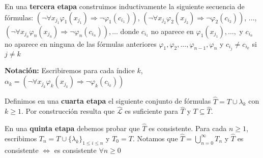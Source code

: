 En una \textbf{tercera etapa} construimos inductivamente la siguiente secuencia de f\'ormulas: $(\neg \forall x_{j_{1}} \varphi_{1}(x_{j_{1}}) \Rightarrow \neg \varphi_{1}(c_{i_{1}}))$, $(\neg \forall x_{j_{2}} \varphi_{2}(x_{j_{2}}) \Rightarrow \neg \varphi_{2}(c_{i_{2}}))$, $\ldots$, $(\neg \forall x_{j_{n}} \varphi_{n}(x_{j_{n}}) \Rightarrow \neg \varphi_{n}(c_{i_{n}})), \ldots$ donde $c_{i_{1}}$ no aparece en $\varphi_{1}(x_{j_{1}}), \ldots, $ y $c_{i_{n}}$ no aparece en ninguna de las f\'ormulas anteriores $\varphi_{1}, \varphi_{2}, \ldots, \varphi_{n - 1}, \varphi_{n}$ y $c_{i_{j}} \neq c_{i_{k}}$ si $j \neq k$
 
\textbf{Notaci\'on:} Escribiremos para cada \'indice $k$, $\alpha_{k} = (\neg \forall x_{j_{k}} \varphi_{k}(x_{j_{k}}) \Rightarrow \neg \varphi_{k}(c_{i_{k}}))$
 
Definimos en una \textbf{cuarta etapa} el siguiente conjunto de f\'ormulas $\hat{T} = T \cup {\lambda_k}$ con $k \geq 1$. Por construcci\'on resulta que $\hat{\mathcal{L}}$ es suficiente para $\hat{T}$ y $T \subseteq \hat{T}$. 
 
En una \textbf{quinta etapa} debemos probar que $\hat{T}$ es consistente. Para cada $n \geq 1$, escribimos $T_n = T \cup \{ \lambda_k \}_{1 \leq i \leq n}$ y $T_0 = T$. Notamos que $\hat{T} = \bigcup_{n = 0}^{\infty} T_n$ y $\hat{T}$ es consistente $\iff$ es consistente $\forall n \geq 0$
 
